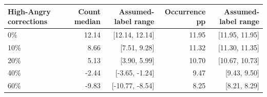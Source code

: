 \begin{tabular}{lrrrr}
\toprule
High-Angry corrections & Count median & Assumed-label range & Occurrence pp & Assumed-label range \\
\midrule
0\% & 12.14 & [12.14, 12.14] & 11.95 & [11.95, 11.95] \\
10\% & 8.66 & [7.51, 9.28] & 11.32 & [11.30, 11.35] \\
20\% & 5.13 & [3.90, 5.99] & 10.70 & [10.67, 10.73] \\
40\% & -2.44 & [-3.65, -1.24] & 9.47 & [9.43, 9.50] \\
60\% & -9.83 & [-10.77, -8.54] & 8.25 & [8.21, 8.29] \\
\bottomrule
\end{tabular}
